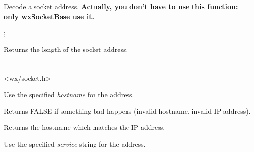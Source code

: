Decode a socket address. {\bf Actually, you don't have to use this
function: only wxSocketBase use it.}

%
%

;

Returns the length of the socket address.

\section{}\label{wxipv4address}




<wx/socket.h>



%
%



Use the specified {\it hostname} for the address.


Returns FALSE if something bad happens (invalid hostname, invalid IP address). 

%
%



Returns the hostname which matches the IP address.

%
%



Use the specified {\it service} string for the address.


